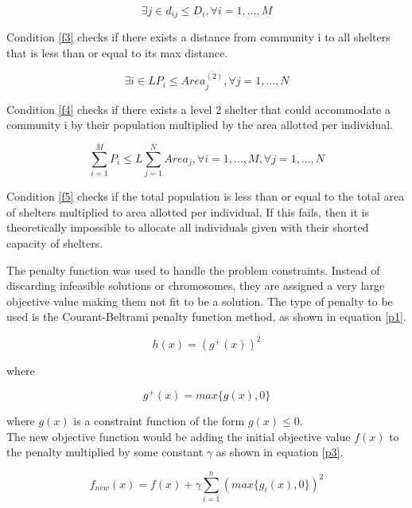 \documentclass[11pt,letterpaper,]{article}
\begin{document}
	\begin{equation} 
		\label{f3}
		\exists j \in d_{ij} \le D_{i}, \forall i = 1, ..., M
	\end{equation}
	
	Condition \ref{f3} checks if there exists a distance from community i to all shelters that is less than or equal to its max distance.
	
	\begin{equation} 
		\label{f4}
		\exists i \in LP_{i} \le Area_{j}^{(2)}, \forall j = 1, ..., N
	\end{equation}
	
	Condition \ref{f4} checks if there exists a level 2 shelter that could accommodate a community i by their population multiplied by the area allotted per individual. 
	
	\begin{equation} 
		\label{f5}
		\sum_{i=1}^{M}P_{i} \le L\sum_{j=1}^{N}Area_{j}, \forall i=1,...,M,  \forall j=1,...,N
	\end{equation}
	
	Condition \ref{f5} checks if the total population is less than or equal to the total area of shelters multiplied to area allotted per individual. If this fails, then it is theoretically impossible to allocate all individuals given with their shorted capacity of shelters.
	
	The penalty function was used to handle the problem constraints. Instead of discarding infeasible solutions or chromosomes, they are assigned a very large objective value making them not fit to be a solution. The type of penalty to be used is the Courant-Beltrami penalty function method, as shown in equation \ref{p1}.
	
	\begin{equation} 
		\label{p1}
		h(x)=(g^+(x))^2
	\end{equation}
	
	where
	
	\begin{equation} 
		\label{p2}
		g^+(x)=max\{g(x),0\}
	\end{equation}
	
	where $g(x)$ is a constraint function of the form $g(x)\le0$. 
	\\
	The new objective function would be adding the initial objective value $f(x)$ to the penalty multiplied by some constant $\gamma$ as shown in equation \ref{p3}.
	
	\begin{equation} 
		\label{p3}
		f_{new}(x)=f(x)+\gamma\sum_{i=1}^{n}(max\{g_i(x),0\})^2
	\end{equation}
	
\end{document}
